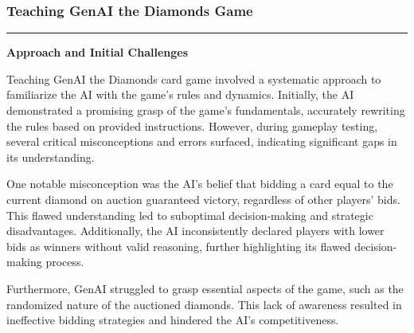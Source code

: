 \documentclass{article}
\begin{document}
\newpage
\begin{frame}
\frametitle{\LARGE Teaching GenAI the Diamonds Game}
\vspace{0.5cm}
\centering
\textcolor{gray}{\rule{\linewidth}{0.5pt}}
{\centering\textbf{\LARGE Approach and Initial Challenges}\par}

\raggedright
\Large
Teaching GenAI the Diamonds card game involved a systematic approach to familiarize the AI with the game's rules and dynamics. Initially, the AI demonstrated a promising grasp of the game's fundamentals, accurately rewriting the rules based on provided instructions. However, during gameplay testing, several critical misconceptions and errors surfaced, indicating significant gaps in its understanding.

\vspace{1cm}
One notable misconception was the AI's belief that bidding a card equal to the current diamond on auction guaranteed victory, regardless of other players' bids. This flawed understanding led to suboptimal decision-making and strategic disadvantages. Additionally, the AI inconsistently declared players with lower bids as winners without valid reasoning, further highlighting its flawed decision-making process.

\vspace{1cm}
Furthermore, GenAI struggled to grasp essential aspects of the game, such as the randomized nature of the auctioned diamonds. This lack of awareness resulted in ineffective bidding strategies and hindered the AI's competitiveness.
\vspace{1cm}

\end{frame}
\end{document}
